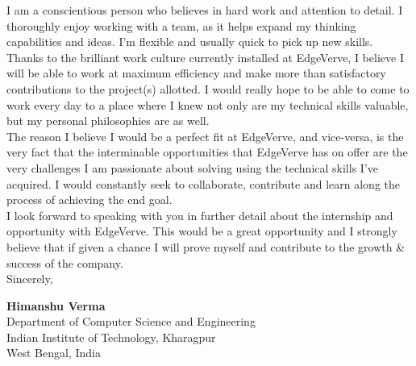 \documentclass[a4paper,10pt]{extarticle} %
\begin{document}
I am a conscientious person who believes in hard work and attention to detail. I thoroughly enjoy working with a team, as it helps expand my thinking capabilities and ideas. I’m ﬂexible and usually quick to pick up new skills. Thanks to the brilliant work culture currently installed at EdgeVerve, I believe I will be able to work at maximum efficiency and make more than satisfactory contributions to the project(s) allotted. I would really hope to be able to come to work every day to a place where I knew not only are my technical skills valuable, but my personal philosophies are as well.\\

The reason I believe I would be a perfect fit at EdgeVerve, and vice-versa, is the very fact that the interminable opportunities that EdgeVerve has on offer are the very challenges I am passionate about solving using the technical skills I've acquired. I would constantly seek to collaborate, contribute and learn along the process of achieving the end goal.\\

I look forward to speaking with you in further detail about the internship and opportunity with EdgeVerve. This would be a great opportunity and I strongly believe that if given a chance I will prove myself and contribute to the growth \& success of the company.\\

Sincerely,

\textbf{\large{Himanshu Verma}}\\
Department of Computer Science and Engineering\\
Indian Institute of Technology, Kharagpur\\
West Bengal, India\\

\end{document}
